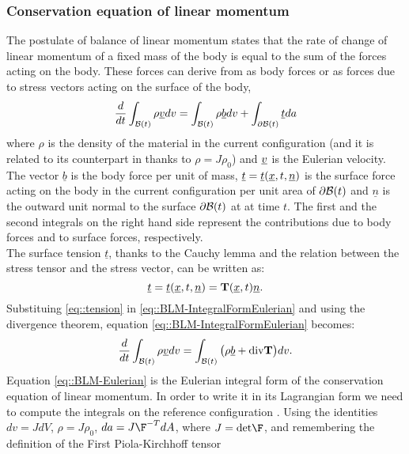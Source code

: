 \subsubsection{Conservation equation of linear momentum}
\label{sct-Conservation} The postulate of balance of linear momentum
states that the rate of change of linear momentum of a fixed mass of
the body is equal to the sum of the forces acting on the body. These
forces can derive from as body forces or as forces due to stress
vectors acting on the surface of the body,
\begin{equation} \frac{d}{dt}\int_{\mathcal{B}(t)}\rho\underline{v} dv =
\int_{\mathcal{B}(t)}\rho\underline{b}
dv+\int_{\partial\mathcal{B}(t)}\underline{t}da
  \label{eq::BLM-IntegralFormEulerian}
\end{equation} where $\rho$ is the density of the material in the
current configuration (and it is related to its counterpart in \RefCon
thanks to $\rho=J\rho_0$) and $\underline{v}$ is the Eulerian velocity. The
vector $\underline{b}$ is the body force per unit of mass,
$\underline{t}=\underline{t}(\underline{x},t, \underline{n})$ is the surface
force acting on the body in the current configuration per unit area of
$\partial\mathcal{B}(t)$ and $\underline{n}$ is the outward unit normal to
the surface $\partial\mathcal{B}(t)$ at \npos at time $t$. The first and the
second integrals on the right hand side represent the contributions
due to body forces and to surface forces, respectively.\\ The surface
tension $\underline{t}$, thanks to the Cauchy lemma and the relation
between the stress tensor and the stress vector, can be written as:
\begin{equation} \underline{t}=\underline{t}(\underline{x},t,
\underline{n})=\textbf{T}(\underline{x},t)\underline{n}.
  \label{eq::tension}
\end{equation} Substituing \eqref{eq::tension} in
\eqref{eq::BLM-IntegralFormEulerian} and using the divergence theorem,
equation \eqref{eq::BLM-IntegralFormEulerian} becomes:
\begin{equation} \frac{d}{dt}\int_{\mathcal{B}(t)}\rho\underline{v} dv =
\int_{\mathcal{B}(t)}\big(\rho\underline{b} +\text{div}\textbf{T} \big)dv.
  \label{eq::BLM-Eulerian}
\end{equation} Equation \eqref{eq::BLM-Eulerian} is the Eulerian
integral form of the conservation equation of linear momentum. In
order to write it in its Lagrangian form we need to compute the
integrals on the reference configuration \RefCon. Using the identities
$dv=JdV$, $\rho=J\rho_0$, $da=J\F^{-T}dA$, where $J=\text{det}\F$, and
remembering the definition of the First Piola-Kirchhoff tensor
